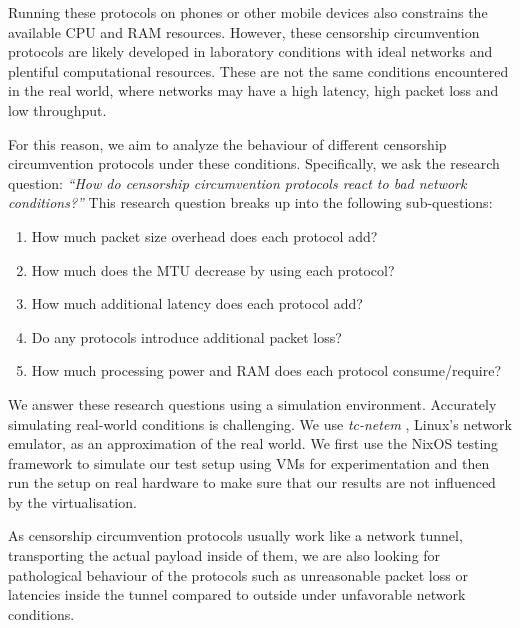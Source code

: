 Running these protocols on phones or other mobile devices also constrains the available CPU and RAM resources.
However, these censorship circumvention protocols are likely developed in laboratory conditions with ideal networks and plentiful computational resources.
These are not the same conditions encountered in the real world, where networks may have a high latency, high packet loss and low throughput.

For this reason, we aim to analyze the behaviour of different censorship circumvention protocols under these conditions.
Specifically, we ask the research question:
\emph{``How do censorship circumvention protocols react to bad network conditions?''}
This research question breaks up into the following sub-questions:
\begin{enumerate}
  \item How much packet size overhead does each protocol add?
  \item How much does the MTU decrease by using each protocol?
  \item How much additional latency does each protocol add?
  \item Do any protocols introduce additional packet loss?
  \item How much processing power and RAM does each protocol consume/require?
\end{enumerate}

We answer these research questions using a simulation environment.
Accurately simulating real-world conditions is challenging.
We use \textit{tc-netem} \cite{man8:tc-netem}, Linux's network emulator, as an approximation of the real world.
We first use the NixOS testing framework to simulate our test setup using VMs for experimentation and then run the setup on real hardware to make sure that our results are not influenced by the virtualisation.

As censorship circumvention protocols usually work like a network tunnel, transporting the actual payload inside of them, we are also looking for pathological behaviour of the protocols such as unreasonable packet loss or latencies inside the tunnel compared to outside under unfavorable network conditions.

